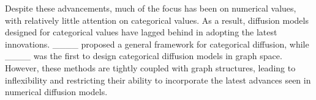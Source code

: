Despite these advancements, much of the focus has been on numerical values, with relatively little attention on categorical values. 
As a result, diffusion models designed for categorical values have lagged behind in adopting the latest innovations.
____ proposed a general framework for categorical diffusion, while ____ was the first to design categorical diffusion models in graph space. 
However, these methods are tightly coupled with graph structures, leading to inflexibility and restricting their ability to incorporate the latest advances seen in numerical diffusion models.


